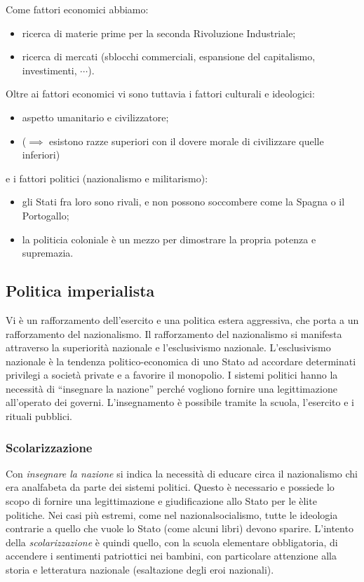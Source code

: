 \documentclass[a4paper]{article}
\begin{document}
Come fattori economici abbiamo:
\begin{itemize}
    \item ricerca di materie prime per la seconda Rivoluzione Industriale;
    \item ricerca di mercati (sblocchi commerciali, espansione del capitalismo, investimenti, \(\cdots\)).
\end{itemize}
Oltre ai fattori economici vi sono tuttavia i fattori culturali e ideologici:
\begin{itemize}
    \item aspetto umanitario e civilizzatore;
    \item (\(\implies\) esistono razze superiori con il dovere morale di civilizzare quelle inferiori)
\end{itemize}
e i fattori politici (nazionalismo e militarismo):
\begin{itemize}
    \item gli Stati fra loro sono rivali, e non possono soccombere come la Spagna o il Portogallo;
    \item la politicia coloniale è un mezzo per dimostrare la propria potenza e supremazia.
\end{itemize}

\subsection{Politica imperialista}

Vi è un rafforzamento dell'esercito e una politica estera aggressiva, che porta a un
rafforzamento del nazionalismo. Il rafforzamento del nazionalismo si manifesta attraverso la
superiorità nazionale e l'esclusivismo nazionale. L'esclusivismo nazionale è la tendenza
politico-economica di uno Stato ad accordare determinati privilegi a società private e a
favorire il monopolio. I sistemi politici hanno la necessità di “insegnare la nazione” perché
vogliono fornire una legittimazione all'operato dei governi. L'insegnamento è possibile
tramite la scuola, l'esercito e i rituali pubblici.

\subsubsection{Scolarizzazione}

Con \textit{insegnare la nazione} si indica la necessità di educare circa il nazionalismo
chi era analfabeta da parte dei sistemi politici.
Questo è necessario e possiede lo scopo di fornire una legittimazione e
giudificazione allo Stato per le èlite politiche.
Nei casi più estremi, come nel nazionalsocialismo, tutte le ideologia
contrarie a quello che vuole lo Stato (come alcuni libri) devono sparire.
L'intento della \textit{scolarizzazione} è quindi quello,
con la scuola elementare obbligatoria, di accendere i sentimenti patriottici nei bambini,
con particolare attenzione alla storia e letteratura nazionale (esaltazione degli eroi nazionali).
\end{document}
